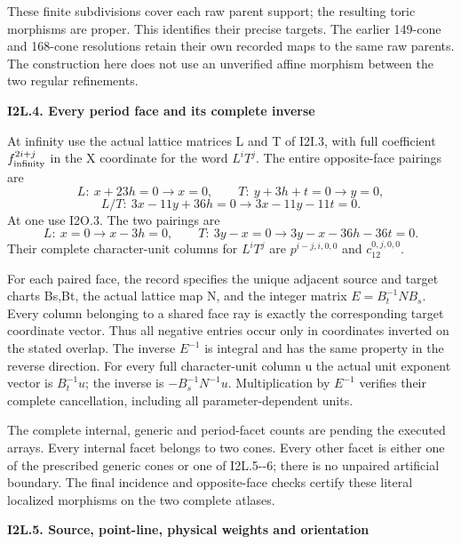 These finite subdivisions cover each raw
parent support; the resulting toric morphisms
are proper. This identifies their precise
targets. The earlier 149-cone and 168-cone
resolutions retain their own recorded maps
to the same raw parents. The construction
here does not use an unverified affine
morphism between the two regular refinements.

\par

\medskip\noindent\textbf{I2L.4. Every period face and its complete inverse}

\par\nobreak

At infinity use the actual lattice matrices
L and T of I2I.3, with full coefficient
\(f_{\rm infinity}^{2i+j}\) in the X coordinate for
the word \(L^iT^j\). The entire opposite-face
pairings are
\[
 L:\ x+23h=0\longrightarrow x=0,\qquad
 T:\ y+3h+t=0\longrightarrow y=0,
\]
\[
 L/T:\ 3x-11y+36h=0\longrightarrow3x-11y-11t=0.
 \tag{I2L.5}
\]
At one use I2O.3. The two pairings are
\[
 L:\ x=0\longrightarrow x-3h=0,\qquad
 T:\ 3y-x=0\longrightarrow3y-x-36h-36t=0.
 \tag{I2L.6}
\]
Their complete character-unit columns for
\(L^iT^j\) are \(p^{i-j,i,0,0}\) and
\(c_{12}^{0,j,0,0}\).

For each paired face, the record specifies
the unique adjacent source and target charts
Bs,Bt, the actual lattice map N, and the
integer matrix \(E=B_{t}^{-1} N B_{s}\). Every column
belonging to a shared face ray is exactly
the corresponding target coordinate vector.
Thus all negative entries occur only in
coordinates inverted on the stated overlap.
The inverse \(E^{-1}\) is integral and has the
same property in the reverse direction.
For every full character-unit column u the
actual unit exponent vector is \(B_{t}^{-1} u\);
the inverse is \(-B_{s}^{-1} N^{-1} u\). Multiplication
by \(E^{-1}\) verifies their complete cancellation,
including all parameter-dependent units.

The complete internal, generic and period-facet counts are pending
the executed arrays. Every internal
facet belongs to two cones. Every other
facet is either one of the prescribed
generic cones or one of I2L.5-\/-6; there is
no unpaired artificial boundary. The final incidence and opposite-face checks certify these
literal localized morphisms on the two complete atlases.

\par

\medskip\noindent\textbf{I2L.5. Source, point-line, physical weights and orientation}

